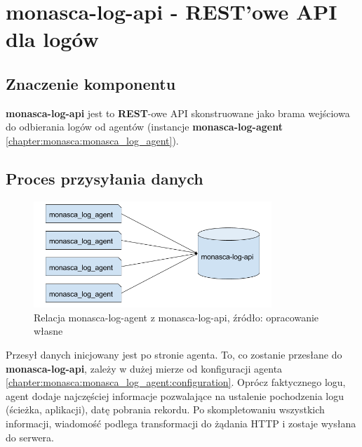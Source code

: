 \section{monasca-log-api - REST'owe API dla logów}
\label{chapter:monasca:monasca_log_api}
    
    \subsection{Znaczenie komponentu}
    \textbf{monasca-log-api} jest to \textbf{REST}-owe API skonstruowane jako
    brama wejściowa do odbierania logów od agentów (instancje \textbf{monasca-log-agent}
    \ref{chapter:monasca:monasca_log_agent}).
    
    \subsection{Proces przysyłania danych}
    \begin{figure}[H]
        \centering
        \includegraphics[width=0.80\textwidth]{images/monasca_log_api_data_flow}
        \caption[Relacja monasca-log-agent z monasca-log-api]{
            Relacja monasca-log-agent z monasca-log-api, źródło: opracowanie własne
        }
        \label{chapter:monasca:monasca_log_api:data_flow}
    \end{figure}
    Przesył danych inicjowany jest po stronie agenta. To, co zostanie przesłane
    do \textbf{monasca-log-api}, zależy w dużej mierze od konfiguracji agenta 
    \ref{chapter:monasca:monasca_log_agent:configuration}. Oprócz faktycznego
    logu, agent dodaje najczęściej informacje pozwalające na ustalenie pochodzenia logu (ścieżka, aplikacji),
    datę pobrania rekordu. Po skompletowaniu wszystkich informacji, wiadomość podlega
    transformacji do żądania HTTP i zostaje wysłana do serwera.
    

